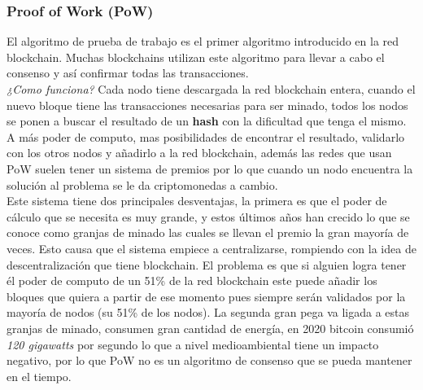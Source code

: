 \subsubsection{Proof of Work (PoW)}

El algoritmo de prueba de trabajo es el primer algoritmo introducido en la red blockchain. Muchas blockchains utilizan este algoritmo para llevar a cabo el consenso y así confirmar todas las transacciones. \\ 

\emph{¿Como funciona?} Cada nodo tiene descargada la red blockchain entera, cuando el nuevo bloque tiene las transacciones necesarias para ser minado, todos los nodos se ponen a buscar el resultado de un \textbf{hash} con la dificultad que tenga el mismo. A más poder de computo, mas posibilidades de encontrar el resultado, validarlo con los otros nodos y añadirlo a la red blockchain, además las redes que usan PoW suelen tener un sistema de premios por lo que cuando un nodo encuentra la solución al problema se le da criptomonedas a cambio. \\

Este sistema tiene dos principales desventajas, la primera es que el poder de cálculo que se necesita es muy grande, y estos últimos años han crecido lo que se conoce como granjas de minado las cuales se llevan el premio la gran mayoría de veces. Esto causa que el sistema empiece a centralizarse, rompiendo con la idea de descentralización que tiene blockchain. El problema es que si alguien logra tener él poder de computo de un 51\% de la red blockchain este puede añadir los bloques que quiera a partir de ese momento pues siempre serán validados por la mayoría de nodos (su 51\% de los nodos). La segunda gran pega va ligada a estas granjas de minado, consumen gran cantidad de energía, en 2020 bitcoin consumió \emph{120 gigawatts} por segundo\cite{bitcoinEnergyUse} lo que a nivel medioambiental tiene un impacto negativo, por lo que PoW no es un algoritmo de consenso que se pueda mantener en el tiempo.


